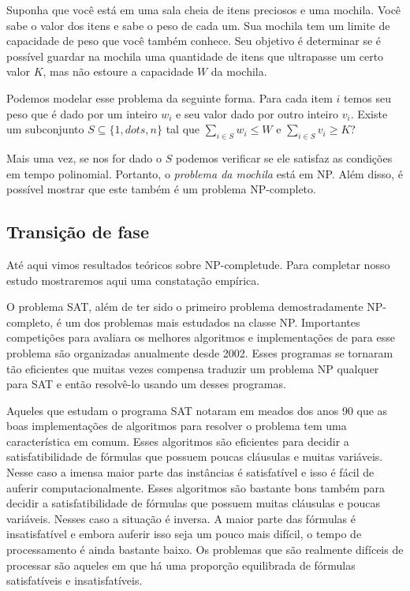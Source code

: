 \begin{example}
  Suponha que você está em uma sala cheia de itens preciosos e uma mochila.
  Você sabe o valor dos itens e sabe o peso de cada um.
  Sua mochila tem um limite de capacidade de peso que você também conhece.
  Seu objetivo é determinar se é possível guardar na mochila uma quantidade de itens que ultrapasse um certo valor $K$, mas não estoure a capacidade $W$ da mochila.

  Podemos modelar esse problema da seguinte forma.
  Para cada item $i$ temos seu peso que é dado por um inteiro $w_i$ e seu valor dado por outro inteiro $v_i$.
  Existe um subconjunto $S \subseteq \{1, dots, n\}$ tal que $\sum_{i \in S} w_i \leq W$ e $\sum_{i \in S} v_i \geq K$?

  Mais uma vez, se nos for dado o $S$ podemos verificar se ele satisfaz as condições em tempo polinomial.
  Portanto, o {\em problema da mochila} está em NP.
  Além disso, é possível mostrar que este também é um problema NP-completo.
\end{example}

\subsection*{Transição de fase}

Até aqui vimos resultados teóricos sobre NP-completude.
Para completar nosso estudo mostraremos aqui uma constatação empírica.

O problema SAT, além de ter sido o primeiro problema demostradamente NP-completo, é um dos problemas mais estudados na classe NP.
Importantes competições para avaliara os melhores algoritmos e implementações de para esse problema são organizadas anualmente desde 2002.
Esses programas se tornaram tão eficientes que muitas vezes compensa traduzir um problema NP qualquer para SAT e então resolvê-lo usando um desses programas.

Aqueles que estudam o programa SAT notaram em meados dos anos 90 que as boas implementações de algoritmos para resolver o problema tem uma característica em comum.
Esses algoritmos são eficientes para decidir a satisfatibilidade de fórmulas que possuem poucas cláusulas e muitas variáveis.
Nesse caso a imensa maior parte das instâncias é satisfatível e isso é fácil de auferir computacionalmente.
Esses algoritmos são bastante bons também para decidir a satisfatibilidade de fórmulas que possuem muitas cláusulas e poucas variáveis.
Nesses caso a situação é inversa.
A maior parte das fórmulas é insatisfatível e embora auferir isso seja um pouco mais difícil, o tempo de processamento é ainda bastante baixo.
Os problemas que são realmente difíceis de processar são aqueles em que há uma proporção equilibrada de fórmulas satisfatíveis e insatisfatíveis.

